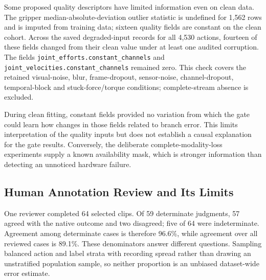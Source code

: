 Some proposed quality descriptors have limited information even on clean data. The
gripper median-absolute-deviation outlier statistic is undefined for 1,562 rows and is
imputed from training data; sixteen quality fields are constant on the clean cohort.
Across the saved degraded-input records for all 4,530 actions, fourteen of these fields
changed from their clean value under at least one audited corruption. The fields
\texttt{joint\_efforts.constant\_channels} and
\texttt{joint\_velocities.constant\_channels} remained zero. This check covers the retained
visual-noise, blur, frame-dropout, sensor-noise, channel-dropout, temporal-block and
stuck-force/torque conditions; complete-stream absence is excluded.

During clean fitting, constant fields provided no variation from which the gate could
learn how changes in those fields related to branch error. This limits interpretation of
the quality inputs but does not establish a causal explanation for the gate results.
Conversely, the deliberate complete-modality-loss experiments supply a known availability
mask, which is stronger information than detecting an unnoticed hardware failure.

\subsection{Human Annotation Review and Its Limits}
One reviewer completed 64 selected clips. Of 59 determinate judgments, 57 agreed with
the native outcome and two disagreed; five of 64 were indeterminate. Agreement among
determinate cases is therefore 96.6\%, while agreement over all reviewed cases is
89.1\%. These denominators answer different questions. Sampling balanced action and
label strata with recording spread rather than drawing an unstratified population
sample, so neither proportion is an unbiased dataset-wide error estimate.

